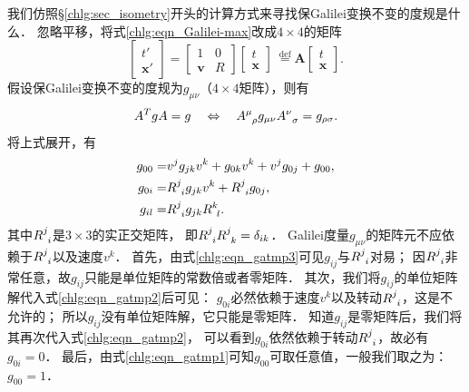 我们仿照\S\ref{chlg:sec_isometry}开头的计算方式来寻找保Galilei变换不变的度规是什么．
忽略平移，将式\eqref{chlg:eqn_Galilei-max}改成$4\times 4$的矩阵
\begin{equation}
	\begin{bmatrix}  t' \\ \boldsymbol{x}'   \end{bmatrix} =
	\begin{bmatrix}  1 & 0  \\ \boldsymbol{v} & R   \end{bmatrix}
	\begin{bmatrix}  t \\ \boldsymbol{x}  \end{bmatrix} 
	\  \overset{\mathrm {def}}{=} \boldsymbol{A} \begin{bmatrix}  t \\ \boldsymbol{x}  \end{bmatrix} .
\end{equation}
假设保Galilei变换不变的度规为$g_{\mu\nu}$（$4\times 4$矩阵），则有
\begin{equation}
	A^T g A = g \quad \Leftrightarrow \quad
	A^{\mu}_{\hphantom{\mu}\rho} g_{\mu\nu} A^{\nu}_{\hphantom{\mu}\sigma} = g_{\rho\sigma}.
\end{equation}
将上式展开，有
\begin{align}
	g_{00} = & v^j g_{jk} v^k + g_{0k} v^k + v^j g_{0j} + g_{00}, \label{chlg:eqn_gatmp1} \\
	g_{0i} = & R^{j}_{\hphantom{j}i} g_{jk} v^k + R^j_{\hphantom{j}i} g_{0j}, \label{chlg:eqn_gatmp2} \\
	g_{il} = & R^j_{\hphantom{j}i} g_{jk} R^k_{\hphantom{j}l} . \label{chlg:eqn_gatmp3}
\end{align}
其中$R^{j}_{\hphantom{j}i}$是$3\times 3$的实正交矩阵，
即$R^{j}_{\hphantom{j}i} R^{j}_{\hphantom{j}k} =\delta_{ik}$．
Galilei度量$g_{\mu\nu}$的矩阵元不应依赖于$R^{j}_{\hphantom{j}i}$以及速度$v^k$．
首先，由式\eqref{chlg:eqn_gatmp3}可见$g_{ij}$与$R^{j}_{\hphantom{j}i}$对易；
因$R^{j}_{\hphantom{j}i}$非常任意，故$g_{ij}$只能是单位矩阵的常数倍或者零矩阵．
其次，我们将$g_{ij}$的单位矩阵解代入式\eqref{chlg:eqn_gatmp2}后可见：
$g_{0i}$必然依赖于速度$v^k$以及转动$R^{j}_{\hphantom{j}i}$，这是不允许的；
所以$g_{ij}$没有单位矩阵解，它只能是零矩阵．
知道$g_{ij}$是零矩阵后，我们将其再次代入式\eqref{chlg:eqn_gatmp2}，
可以看到$g_{0i}$依然依赖于转动$R^{j}_{\hphantom{j}i}$，故必有$g_{0i}=0$．
最后，由式\eqref{chlg:eqn_gatmp1}可知$g_{00}$可取任意值，一般我们取之为：$g_{00}=1$．

